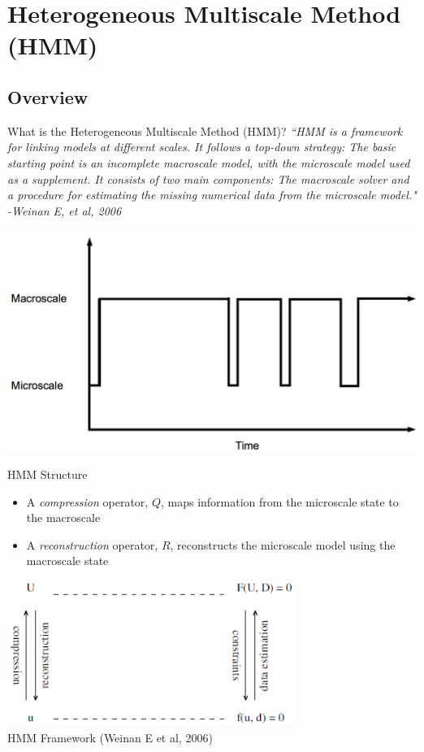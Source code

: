 \documentclass{beamer}
\begin{document}
	\section{Heterogeneous Multiscale Method (HMM)}
	\subsection{Overview}
	\begin{frame}{What is the Heterogeneous Multiscale Method (HMM)?}
		\vspace{1em}
		\em``HMM is a framework for linking models at different scales. It follows a top-down strategy: The basic starting point is an incomplete macroscale model, with the microscale model used as a supplement. It consists of two main components: The macroscale solver and a procedure for estimating the missing numerical data from the microscale model."\hfill\\\hfill\normalfont -Weinan E, et al, 2006
		\vspace{-1em}
		\begin{center}
			\includegraphics[height = 0.5\textheight]{scheme.png}
			\end{center}
	\end{frame}
	
	\begin{frame}{HMM Structure}
		\begin{itemize}
			\item  A \emph{compression} operator, $Q$, maps information from the microscale state to the macroscale
			\item  A \emph{reconstruction} operator, $R$, reconstructs the microscale model using the macroscale state
		\end{itemize}
		\begin{center}
			\includegraphics[width=0.7\textwidth]{framework.png}
			\\\tiny HMM Framework (Weinan E et al, 2006)
		\end{center}
	\end{frame}
	
\end{document}
